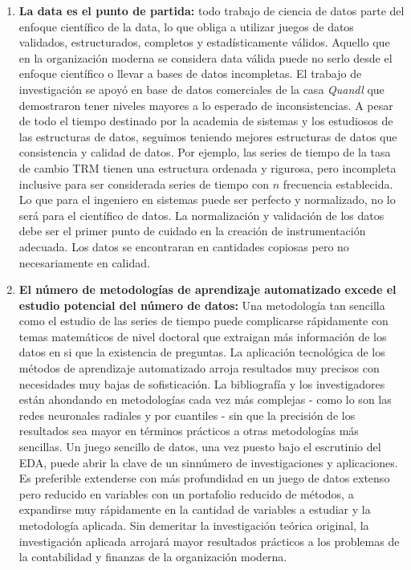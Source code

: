 \begin{enumerate}
    \item \textbf{La data es el punto de partida:} todo trabajo de ciencia de datos parte del enfoque científico de la data, lo que obliga a utilizar juegos de datos validados, estructurados, completos y estadísticamente válidos. Aquello que en la organización moderna se considera data válida puede no serlo desde el enfoque científico o llevar a bases de datos incompletas. El trabajo de investigación se apoyó en base de datos comerciales de la casa \emph{Quandl} que demostraron tener niveles mayores a lo esperado de inconsistencias. A pesar de todo el tiempo destinado por la academia de sistemas y los estudiosos de las estructuras de datos, seguimos teniendo mejores estructuras de datos que consistencia y calidad de datos. Por ejemplo, las series de tiempo de la tasa de cambio TRM tienen una estructura ordenada y rigurosa, pero incompleta inclusive para ser considerada series de tiempo con $n$ frecuencia establecida. Lo que para el ingeniero en sistemas puede ser perfecto y normalizado, no lo será para el científico de datos. La normalización y validación de los datos debe ser el primer punto de cuidado en la creación de instrumentación adecuada. Los datos se encontraran en cantidades copiosas pero no necesariamente en calidad.
    \item \textbf{El número de metodologías de aprendizaje automatizado excede el estudio potencial del número de datos:} Una metodología tan sencilla como el estudio de las series de tiempo puede complicarse rápidamente con temas matemáticos de nivel doctoral que extraigan más información de los datos en si que la existencia de preguntas. La aplicación tecnológica de los métodos de aprendizaje automatizado arroja resultados muy precisos con necesidades muy bajas de sofisticación. La bibliografía y los investigadores están ahondando en metodologías cada vez más complejas - como lo son las redes neuronales radiales y por cuantiles - sin que la precisión de los resultados sea mayor en términos prácticos a otras metodologías más sencillas. Un juego sencillo de datos, una vez puesto bajo el escrutinio del EDA, puede abrir la clave de un sinnúmero de investigaciones y aplicaciones. Es preferible extenderse con más profundidad en un juego de datos extenso pero reducido en variables con un portafolio reducido de métodos, a expandirse muy rápidamente en la cantidad de variables a estudiar y la metodología aplicada. Sin demeritar la investigación teórica original, la investigación aplicada arrojará mayor resultados prácticos a los problemas de la contabilidad y finanzas de la organización moderna.

\end{enumerate}

